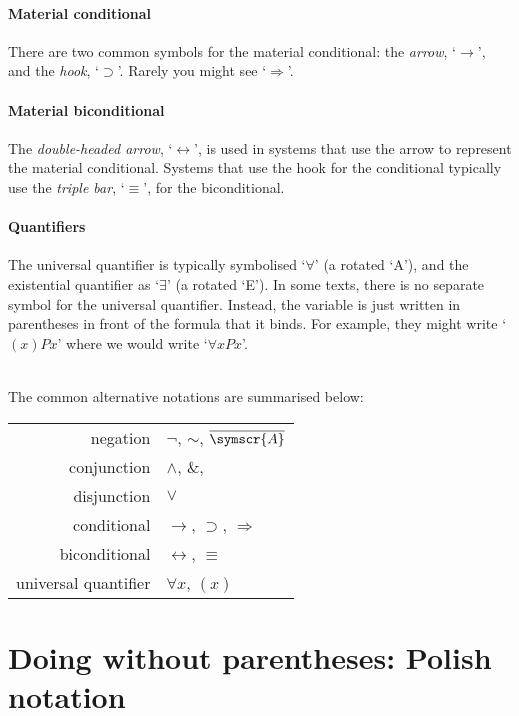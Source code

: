 \paragraph{Material conditional} There are two common symbols for the material conditional: the \emph{arrow}, `$\rightarrow$', and the \emph{hook}, `$\supset$'. Rarely you might see `$\Rightarrow$'.

\paragraph{Material biconditional} The \emph{double-headed arrow}, `$\leftrightarrow$', is used in systems that use the arrow to represent the material conditional. Systems that use the hook for the conditional typically use the \emph{triple bar}, `$\equiv$', for the biconditional.



\paragraph{Quantifiers} The universal quantifier is typically symbolised `$\forall$' (a rotated `\textsf{A}'), and the existential quantifier as `$\exists$' (a rotated `\textsf{E}'). In some texts, there is no separate symbol for the universal quantifier. Instead, the variable is just written in parentheses in front of the formula that it binds. For example, they might write `$(x)Px$' where we would write `$\forall x Px$'.


\
\\The common alternative notations are summarised below:

\begin{center}
\begin{tabular}{rl} \toprule 
negation & $\neg$, $∼$, $\overline{\symscr{A}}$\\
conjunction & $\wedge$, $\&$, {\scriptsize\textbullet}\\
disjunction & $\vee$\\
conditional & $\rightarrow$, $\supset$, $\Rightarrow$\\
biconditional & $\leftrightarrow$, $\equiv$\\
universal quantifier & $\forall x$, $(x)$\\ \bottomrule
\end{tabular}
\end{center}

\newpage
\section*{Doing without parentheses: Polish notation} \label{polish}

